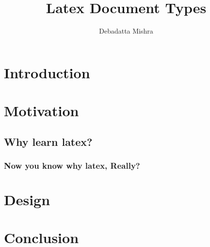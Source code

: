 \documentclass[a4paper, 11pt,twocolumn]{article}
\title{Latex Document Types}
\author{Debadatta Mishra}
\date{}
\begin{document}
\maketitle
\begin{abstract}
\lipsum[15]
\end{abstract}    
\section{Introduction}
\lipsum[50]


\lipsum[50]


\lipsum[50]

\section{Motivation}

\lipsum[50]
\subsection{Why learn latex?}
\lipsum[50]

\lipsum[50]

\subsubsection{Now you know why latex, Really?}
\lipsum[50]

\lipsum[50]

\section{Design}
\lipsum[50]

\lipsum[50]

\lipsum[50]
\section{Conclusion}
\lipsum[30]
\end{document}
